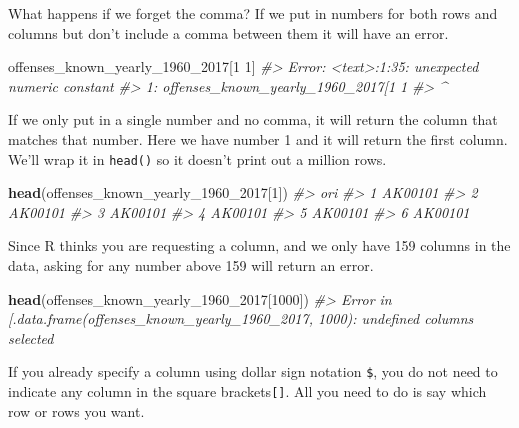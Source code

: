 \documentclass[
  12pt,
]{book}
\newenvironment{Shaded}{\begin{snugshade}}{\end{snugshade}}
\newcommand{\CommentTok}[1]{\textcolor[rgb]{0.56,0.35,0.01}{\textit{#1}}}
\newcommand{\DecValTok}[1]{\textcolor[rgb]{0.00,0.00,0.81}{#1}}
\newcommand{\KeywordTok}[1]{\textcolor[rgb]{0.13,0.29,0.53}{\textbf{#1}}}
\newcommand{\NormalTok}[1]{#1}
\begin{document}
What happens if we forget the comma? If we put in numbers for both rows and columns but don't include a comma between them it will have an error.

\begin{Shaded}
\begin{Highlighting}[]
\NormalTok{offenses\_known\_yearly\_}\DecValTok{1960}\NormalTok{\_}\DecValTok{2017}\NormalTok{[}\DecValTok{1} \DecValTok{1}\NormalTok{]}
\CommentTok{\#> Error: <text>:1:35: unexpected numeric constant}
\CommentTok{\#> 1: offenses\_known\_yearly\_1960\_2017[1 1}
\CommentTok{\#>                                       \^{}}
\end{Highlighting}
\end{Shaded}

If we only put in a single number and no comma, it will return the column that matches that number. Here we have number 1 and it will return the first column. We'll wrap it in \texttt{head()} so it doesn't print out a million rows.

\begin{Shaded}
\begin{Highlighting}[]
\KeywordTok{head}\NormalTok{(offenses\_known\_yearly\_}\DecValTok{1960}\NormalTok{\_}\DecValTok{2017}\NormalTok{[}\DecValTok{1}\NormalTok{])}
\CommentTok{\#>       ori}
\CommentTok{\#> 1 AK00101}
\CommentTok{\#> 2 AK00101}
\CommentTok{\#> 3 AK00101}
\CommentTok{\#> 4 AK00101}
\CommentTok{\#> 5 AK00101}
\CommentTok{\#> 6 AK00101}
\end{Highlighting}
\end{Shaded}

Since R thinks you are requesting a column, and we only have 159 columns in the data, asking for any number above 159 will return an error.

\begin{Shaded}
\begin{Highlighting}[]
\KeywordTok{head}\NormalTok{(offenses\_known\_yearly\_}\DecValTok{1960}\NormalTok{\_}\DecValTok{2017}\NormalTok{[}\DecValTok{1000}\NormalTok{])}
\CommentTok{\#> Error in \textasciigrave{}[.data.frame\textasciigrave{}(offenses\_known\_yearly\_1960\_2017, 1000): undefined columns selected}
\end{Highlighting}
\end{Shaded}

If you already specify a column using dollar sign notation \texttt{\$}, you do not need to indicate any column in the square brackets\texttt{{[}{]}}. All you need to do is say which row or rows you want.
\end{document}
